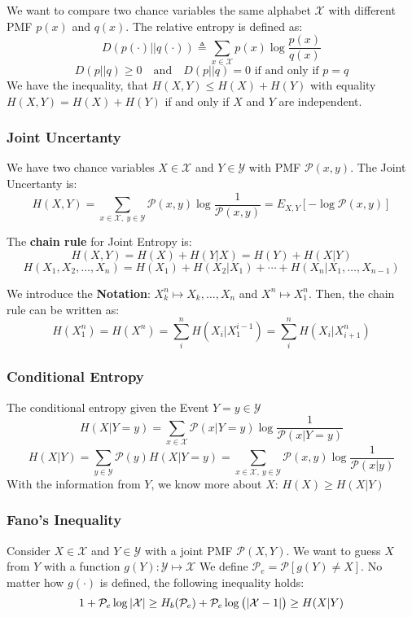 \documentclass[a4paper]{article}
\begin{document}
\begin{twocolumn}
We want to compare two chance variables the same alphabet $\mathcal{X}$ with different PMF $p(x)$ and $q(x)$. The relative entropy is defined as:
\[D\left(p(\cdot) || q(\cdot) \right) \triangleq \sum_{x \in \mathcal{X}} p(x) \log \frac{p(x)}{q(x)}\]
\[D(p||q) \geq 0 \quad \text{and} \quad D(p||q) = 0 \text{ if and only if } p = q\]
We have the inequality, that $H(X,Y) \leq H(X) + H(Y)$ with equality $H(X,Y) = H(X) + H(Y)$ if and only if $X$ and $Y$ are independent.

\subsubsection{Joint Uncertanty}
We have two chance variables $X \in \mathcal{X}$ and $Y \in \mathcal{Y}$ with PMF $\mathcal{P}(x,y)$. The Joint Uncertanty is:
\[H(X,Y) = \sum_{x \in \mathcal{X},\ y \in \mathcal{Y}} \mathcal{P}(x,y) \log \frac{1}{\mathcal{P}(x,y)} = E_{X,Y} \left[ -\log \mathcal{P}(x,y) \right]\]

The \textbf{chain rule} for Joint Entropy is:
\[H(X,Y) = H(X) + H(Y|X) = H(Y) + H(X|Y)\]
\[H(X_1,X_2,\ldots,X_n) = H(X_1) + H(X_2|X_1) + \cdots + H(X_n|X_1,\ldots,X_{n-1})\]

We introduce the \textbf{Notation}: $X_k^n \mapsto X_k,\ldots,X_n$ and $X^n \mapsto X_1^n$. Then, the chain rule can be written as:
\[H(X_1^n) = H(X^n) = \sum_i^n H(X_i|X_1^{i-1}) = \sum_i^n H(X_i|X_{i+1}^n)\]


\subsubsection{Conditional Entropy}
The conditional entropy given the Event $Y = y \in \mathcal{Y}$ 
\[H(X|Y=y) = \sum_{x \in \mathcal{X}} \mathcal{P}(x|Y=y) \log \frac{1}{\mathcal{P}(x|Y=y)}\]
\[H(X|Y) = \sum_{y \in \mathcal{Y}} \mathcal{P}(y) H(X|Y=y) = \sum_{x \in \mathcal{X},\ y \in \mathcal{Y}} \mathcal{P}(x,y) \log \frac{1}{\mathcal{P}(x|y)}\]
With the information from $Y$, we know more about $X$: $H(X) \geq H(X|Y)$

\subsubsection{Fano's Inequality}
Consider $X \in \mathcal{X}$ and $Y \in \mathcal{Y}$ with a joint PMF $\mathcal{P}(X,Y)$. 
We want to guess $X$ from $Y$ with a function $g(Y): \mathcal{Y} \mapsto \mathcal{X}$
We define $\mathcal{P}_e = \mathcal{P}\left[ g(Y) \neq X \right]$.
No matter how $g(\cdot)$ is defined, the following inequality holds:
\[ 1 + \mathcal{P}_e \log \left| \mathcal{X} \right| \geq H_b(\mathcal{P}_e) + \mathcal{P}_e \log \left( \left| \mathcal{X}-1 \right| \right) \geq H(X|Y) \]


\end{twocolumn}
\end{document}
